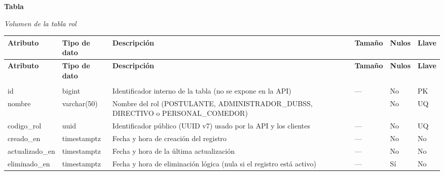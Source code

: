 
\label{tab:volumen_rol}
\noindent\textbf{Tabla~\thetable}\par\nopagebreak
\noindent\textit{Volumen de la tabla rol}\par\nopagebreak
\begingroup\small\linespread{1}\selectfont\setlength{\tabcolsep}{4pt}
\begin{longtable}{>{\raggedright\arraybackslash}p{3.4cm} >{\raggedright\arraybackslash}p{2.5cm} >{\raggedright\arraybackslash}p{4.8cm} >{\centering\arraybackslash}p{1.6cm}>{\centering\arraybackslash}p{1.1cm} >{\centering\arraybackslash}p{1.3cm}}
\toprule
\textbf{Atributo} & \textbf{Tipo de dato} & \textbf{Descripción} & \textbf{Tamaño} & \textbf{Nulos} & \textbf{Llave} \\
\midrule
\endfirsthead
\toprule
\textbf{Atributo} & \textbf{Tipo de dato} & \textbf{Descripción} & \textbf{Tamaño} & \textbf{Nulos} & \textbf{Llave} \\
\midrule
\endhead
\endfoot
\bottomrule
\multicolumn{6}{l}{\textit{Nota.} Elaboración propia.} \\
\endlastfoot
id & bigint & Identificador interno de la tabla (no se expone en la API) & — & No & PK \\
nombre & varchar(50) & Nombre del rol (POSTULANTE, ADMINISTRADOR\_\allowbreak{}DUBSS, DIRECTIVO o PERSONAL\_\allowbreak{}COMEDOR) & 50 & No & UQ \\
codigo\_\allowbreak{}rol & uuid & Identificador público (UUID v7) usado por la API y los clientes & — & No & UQ \\
creado\_\allowbreak{}en & timestamptz & Fecha y hora de creación del registro & — & No & No \\
actualizado\_\allowbreak{}en & timestamptz & Fecha y hora de la última actualización & — & No & No \\
eliminado\_\allowbreak{}en & timestamptz & Fecha y hora de eliminación lógica (nula si el registro está activo) & — & Sí & No \\
\end{longtable}
\endgroup
\addtocounter{table}{-1}

